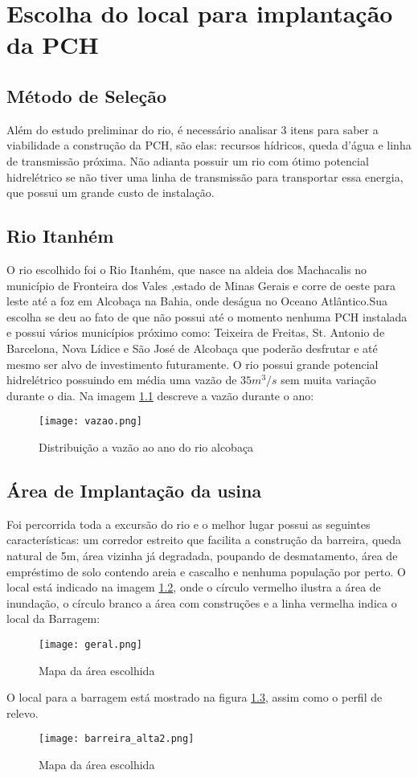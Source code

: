 \chapter{Escolha do local para implantação da PCH}
\section{Método de Seleção}
Além do estudo preliminar do rio, é necessário analisar 3 itens para saber a viabilidade a construção da PCH, são elas: recursos hídricos, queda d'água e linha de transmissão próxima. Não adianta possuir um rio com ótimo potencial hidrelétrico se não tiver uma linha de transmissão para transportar essa energia, que possui um grande custo de instalação.

\section{Rio Itanhém}
O rio escolhido foi o Rio Itanhém, que nasce na aldeia dos Machacalis no município de Fronteira dos Vales ,estado de Minas Gerais e corre de oeste para leste até a foz em Alcobaça na Bahia, onde deságua no Oceano Atlântico.Sua escolha se deu ao fato de que não possui até o momento nenhuma PCH instalada e possui vários municípios próximo como: Teixeira de Freitas, St. Antonio de Barcelona, Nova Lídice e São José de Alcobaça que poderão desfrutar e até mesmo ser alvo de investimento futuramente.
O rio possui grande potencial hidrelétrico possuindo em média uma vazão de $35m^3/s$ sem muita variação durante o dia. Na imagem \ref{fig:vazao} descreve a vazão durante o ano:
\begin{figure}[h]
	\centering
	\texttt{[image: vazao.png]}
	\caption{Distribuição a vazão ao ano do rio alcobaça}
	\label{fig:vazao}
	\source{[10]}
\end{figure}

\section{Área de Implantação da usina}
Foi percorrida toda a excursão do rio e o melhor lugar possui as seguintes características: um corredor estreito que facilita a construção da barreira, queda natural de 5m, área vizinha já degradada, poupando de desmatamento, área de empréstimo de solo contendo areia e cascalho e nenhuma população por perto. O local está indicado na imagem \ref{fig:geral}, onde o círculo vermelho ilustra a área de inundação, o círculo branco a área com construções e a linha vermelha indica o local da Barragem:
\begin{figure}[h]
	\centering
	\texttt{[image: geral.png]}
	\caption{Mapa da área escolhida}
	\label{fig:geral}
\end{figure}
O local para a barragem está mostrado na figura \ref{fig:alta2}, assim como o perfil de relevo.
\begin{figure}[h]
	\centering
	\texttt{[image: barreira\_alta2.png]}
	\caption{Mapa da área escolhida}
	\label{fig:alta2}
\end{figure}

